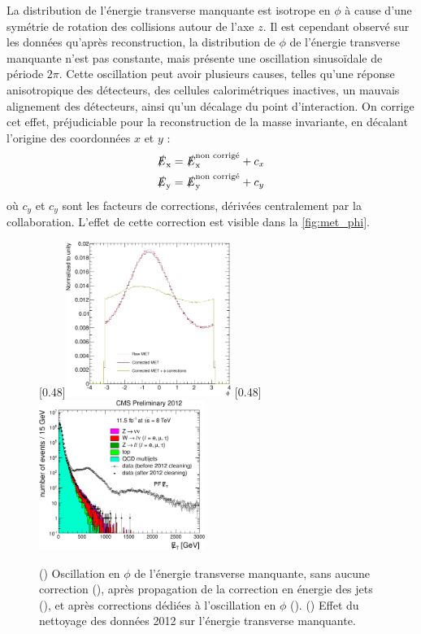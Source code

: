 \medskip

La distribution de l'énergie transverse manquante est isotrope en $\phi$ à cause d'une symétrie de rotation des collisions autour de l'axe $z$. Il est cependant observé sur les données qu'après reconstruction, la distribution de $\phi$ de l'énergie transverse manquante n'est pas constante, mais présente une oscillation sinusoïdale de période \tilde$\num{2}\pi$. Cette oscillation peut avoir plusieurs causes, telles qu'une réponse anisotropique des détecteurs, des cellules calorimétriques inactives, un mauvais alignement des détecteurs, ainsi qu'un décalage du point d'interaction. On corrige cet effet, préjudiciable pour la reconstruction de la masse invariante, en décalant l'origine des coordonnées $x$ et $y$ :
\begin{align*}
  \slashed{E}_{\mathrm{x}} &= \slashed{E}_{\mathrm{x}}^\text{non corrigé} + c_x\\
  \slashed{E}_{\mathrm{y}} &= \slashed{E}_{\mathrm{y}}^\text{non corrigé} + c_y
\end{align*}
où $c_y$ et $c_y$ sont les facteurs de corrections, dérivées centralement par la collaboration. L'effet de cette correction est visible dans la \cref{fig:met_phi}.

\bigskip

\begin{figure}[tbp] \centering
    \subcaptionbox{\label{fig:met_phi}}[0.48\textwidth]{\includegraphics[width=0.48\textwidth]{chapitre7/figs/met_phi_corrections.pdf}}
    \subcaptionbox{\label{fig:met_cleaning}}[0.48\textwidth]{\includegraphics[width=0.48\textwidth]{chapitre7/figs/met_cleaning.pdf}}
    \caption{() Oscillation en $\phi$ de l'énergie transverse manquante, sans aucune correction (\rouge), après propagation de la correction en énergie des jets (\violet), et après corrections dédiées à l'oscillation en $\phi$ (\vertc). () Effet du nettoyage des données 2012 sur l'énergie transverse manquante.}
\end{figure}

